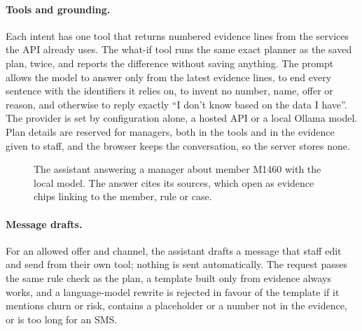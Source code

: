 \paragraph{Tools and grounding.} Each intent has one tool that returns numbered evidence lines from the services the API already uses. The what-if tool runs the same exact planner as the saved plan, twice, and reports the difference without saving anything. The prompt allows the model to answer only from the latest evidence lines, to end every sentence with the identifiers it relies on, to invent no number, name, offer or reason, and otherwise to reply exactly \enquote{I don't know based on the data I have}. The provider is set by configuration alone, a hosted API or a local Ollama model. Plan details are reserved for managers, both in the tools and in the evidence given to staff, and the browser keeps the conversation, so the server stores none.

\begin{figure}[tb]
  \centering
  \caption{The assistant answering a manager about member M1460 with the local  model. The answer cites its sources, which open as evidence chips linking to the member, rule or case.}
  \label{fig:assistant}
\end{figure}

\paragraph{Message drafts.} For an allowed offer and channel, the assistant drafts a message that staff edit and send from their own tool; nothing is sent automatically. The request passes the same rule check as the plan, a template built only from evidence always works, and a language-model rewrite is rejected in favour of the template if it mentions churn or risk, contains a placeholder or a number not in the evidence, or is too long for an SMS.
